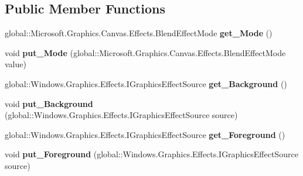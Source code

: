 \subsection*{Public Member Functions}
\begin{DoxyCompactItemize}
\item 
\mbox{\label{interface_microsoft_1_1_graphics_1_1_canvas_1_1_effects_1_1_i_blend_effect_ac8d75c7f80a966ae4cb4accb65b3f2ba}} 
global\+::\+Microsoft.\+Graphics.\+Canvas.\+Effects.\+Blend\+Effect\+Mode {\bfseries get\+\_\+\+Mode} ()
\item 
\mbox{\label{interface_microsoft_1_1_graphics_1_1_canvas_1_1_effects_1_1_i_blend_effect_a74ac8a0ad43cf91117230932b4bf02f3}} 
void {\bfseries put\+\_\+\+Mode} (global\+::\+Microsoft.\+Graphics.\+Canvas.\+Effects.\+Blend\+Effect\+Mode value)
\item 
\mbox{\label{interface_microsoft_1_1_graphics_1_1_canvas_1_1_effects_1_1_i_blend_effect_a9bf514b43e36b2488c8d53157b276ac0}} 
global\+::\+Windows.\+Graphics.\+Effects.\+I\+Graphics\+Effect\+Source {\bfseries get\+\_\+\+Background} ()
\item 
\mbox{\label{interface_microsoft_1_1_graphics_1_1_canvas_1_1_effects_1_1_i_blend_effect_a16dda1810dcd399600c55e24b03baa2c}} 
void {\bfseries put\+\_\+\+Background} (global\+::\+Windows.\+Graphics.\+Effects.\+I\+Graphics\+Effect\+Source source)
\item 
\mbox{\label{interface_microsoft_1_1_graphics_1_1_canvas_1_1_effects_1_1_i_blend_effect_a27971086ad5738eee6bc56e8fa2047a8}} 
global\+::\+Windows.\+Graphics.\+Effects.\+I\+Graphics\+Effect\+Source {\bfseries get\+\_\+\+Foreground} ()
\item 
\mbox{\label{interface_microsoft_1_1_graphics_1_1_canvas_1_1_effects_1_1_i_blend_effect_a9bc8bd434ced7607b3252e64f0a1cf9f}} 
void {\bfseries put\+\_\+\+Foreground} (global\+::\+Windows.\+Graphics.\+Effects.\+I\+Graphics\+Effect\+Source source)

\end{DoxyCompactItemize}
